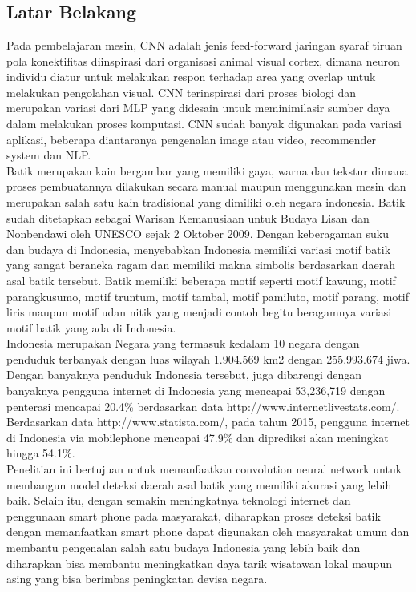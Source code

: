 \chapter{\babSatu}

\section{Latar Belakang}
Pada pembelajaran mesin, CNN adalah jenis feed-forward jaringan syaraf tiruan pola konektifitas diinspirasi dari organisasi animal visual cortex, dimana neuron individu diatur untuk melakukan respon terhadap area yang overlap untuk melakukan pengolahan visual. CNN terinspirasi dari proses biologi dan merupakan variasi dari MLP yang didesain untuk meminimilasir sumber daya dalam melakukan proses komputasi. CNN sudah banyak digunakan pada variasi aplikasi, beberapa diantaranya pengenalan image atau video, recommender system dan NLP.\\
Batik merupakan kain bergambar yang memiliki gaya, warna dan tekstur dimana proses pembuatannya dilakukan secara manual maupun menggunakan mesin dan merupakan salah satu kain tradisional yang dimiliki oleh negara indonesia. Batik sudah ditetapkan sebagai Warisan Kemanusiaan untuk Budaya Lisan dan Nonbendawi oleh UNESCO sejak 2 Oktober 2009. Dengan keberagaman suku dan budaya di Indonesia, menyebabkan Indonesia memiliki variasi motif batik yang sangat beraneka ragam dan memiliki makna simbolis berdasarkan daerah asal batik tersebut. Batik memiliki beberapa motif seperti motif kawung, motif parangkusumo, motif truntum, motif tambal, motif pamiluto, motif parang, motif liris maupun motif udan nitik yang menjadi contoh begitu beragamnya variasi motif batik yang ada di Indonesia.\\
Indonesia merupakan Negara yang termasuk kedalam 10 negara dengan penduduk terbanyak dengan luas wilayah 1.904.569 km2 dengan 255.993.674 jiwa. Dengan banyaknya penduduk Indonesia tersebut, juga dibarengi dengan banyaknya pengguna internet di Indonesia yang mencapai 53,236,719 dengan penterasi mencapai 20.4\% berdasarkan data http://www.internetlivestats.com/. Berdasarkan data http://www.statista.com/, pada tahun 2015, pengguna internet di Indonesia via mobilephone mencapai 47.9\% dan diprediksi akan meningkat hingga 54.1\%.\\
Penelitian ini bertujuan untuk memanfaatkan convolution neural network untuk membangun model deteksi daerah asal batik yang memiliki akurasi yang lebih baik. Selain itu, dengan semakin meningkatnya teknologi internet dan penggunaan smart phone pada masyarakat, diharapkan proses deteksi batik dengan memanfaatkan smart phone dapat digunakan oleh masyarakat umum dan membantu pengenalan salah satu budaya Indonesia yang lebih baik dan diharapkan bisa membantu meningkatkan daya tarik wisatawan lokal maupun asing yang bisa berimbas peningkatan devisa negara.


